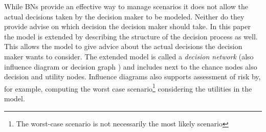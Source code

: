 \documentclass[conference]{IEEEtran}
\begin{document}
While BNs provide an effective way to manage scenarios it does not allow the actual decisions taken by the decision maker to be modeled. Neither do they provide advise on which decision the decision maker should take. In this paper the model is extended by describing the structure of the decision process as well. This allows the model to give advice about the actual decisions the decision maker wants to consider. The extended model is called a {\em decision network} \cite{russell02bn} (also influence diagram or decision graph \cite{jensen07book}) and includes next to the chance nodes also decision and utility nodes. Influence diagrams also supports assessment of risk by, for example, computing the worst case scenario\footnote{The worst-case scenario is not necessarily the most likely scenario} considering the utilities in the model.






%



% 
% 
% 
% 
% 
\end{document}
